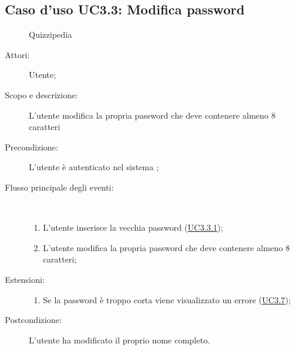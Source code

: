 \subsection{Caso d'uso UC3.3: Modifica password}
	\begin{figure}[H]
		\centering
		\begin{resizedtikzpicture}{\textwidth}
		\begin{umlsystem}[x=0, fill=lightgray!20]{Quizzipedia}
		\end{umlsystem}
		\end{resizedtikzpicture}
		\caption{}
	\end{figure}
\begin{description}
\item[Attori:] Utente;
\item[Scopo e descrizione:] L'utente modifica la propria password che deve contenere almeno 8 caratteri
      \item[Precondizione:] L'utente è autenticato nel sistema
;

        \item[Flusso principale degli eventi:] \ 
 \begin{enumerate}
          \item L'utente inserisce la vecchia password (\hyperlink{UC3.3.1}{UC3.3.1});
          \item L'utente modifica la propria password che deve contenere almeno 8 caratteri;

      \end{enumerate}
    \item[Estensioni:]
      \begin{enumerate}
          \item Se la password è troppo corta viene visualizzato un errore	 (\hyperlink{UC3.7}{UC3.7});

      \end{enumerate}
    \item[Postcondizione:] L'utente ha modificato il proprio nome completo.
  \end{description}
\hypertarget{UC3.3.1}{}
